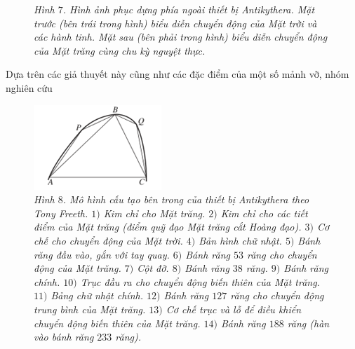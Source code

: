 \begin{multicols}{2}
\begin{figure}[H]
		\caption{\small\textit{\color{lichsutoanhoc}Hình $7$. Hình ảnh phục dựng phía ngoài thiết bị Antikythera. Mặt trước (bên trái trong hình) biểu diễn chuyển động của Mặt trời và các hành tinh. Mặt sau (bên phải trong hình) biểu diễn chuyển động của Mặt trăng cùng chu kỳ nguyệt thực.}}
		\vspace*{-10pt}
	\end{figure}
	Dựa trên các giả thuyết này cũng như các đặc điểm của một số mảnh vỡ, nhóm nghiên cứu 
	\end{multicols}
	\begin{figure}[H]
		\vspace*{5pt}
		\centering
		\captionsetup{labelformat= empty, justification=centering}
		\includegraphics[width= 1\linewidth]{9}
		\caption{\small\textit{\color{lichsutoanhoc}Hình $8$. Mô hình cấu tạo bên trong của thiết bị Antikythera theo Tony Freeth. $1)$ Kim chỉ cho Mặt trăng. $2)$ Kim chỉ cho các tiết điểm của Mặt trăng (điểm quỹ đạo Mặt trăng cắt Hoàng đạo). $3)$ Cơ chế cho chuyển động của Mặt trời. $4)$ Bản hình chữ nhật. $5)$ Bánh răng đầu vào, gắn với tay quay. $6)$ Bánh răng $53$ răng cho chuyển động của Mặt trăng. $7)$ Cột đỡ. $8)$ Bánh răng $38$ răng. $9)$ Bánh răng chính. $10)$ Trục đầu ra cho chuyển động biến thiên của Mặt trăng. $11)$ Bảng chữ nhật chính. $12)$ Bánh răng $127$ răng cho chuyển động trung bình của Mặt trăng. $13)$ Cơ chế trục và lỗ để điều khiển chuyển động biến thiên của Mặt trăng. $14)$ Bánh răng $188$ răng (hàn vào bánh răng $233$ răng).}}
		\vspace*{-10pt}
	\end{figure}
